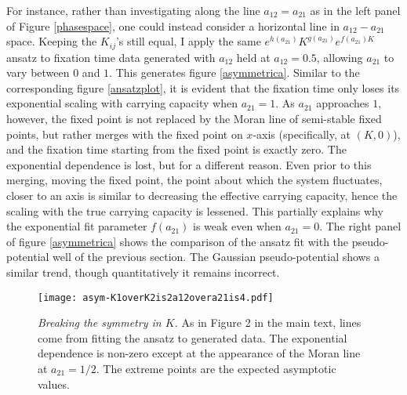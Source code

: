 For instance, rather than investigating along the line $a_{12} = a_{21}$ as in the left panel of Figure \ref{phasespace}, one could instead consider a horizontal line in $a_{12}-a_{21}$ space. 
Keeping the $K_{ij}$'s still equal, I apply the same $e^{h(a_{21})}K^{g(a_{21})}e^{f(a_{21})K}$ ansatz to fixation time data generated with $a_{12}$ held at $a_{12}=0.5$, allowing $a_{21}$ to vary between $0$ and $1$. 
This generates figure \ref{asymmetrica}. %
Similar to the corresponding figure \ref{ansatzplot}, it is evident that the fixation time only loses its exponential scaling with carrying capacity when $a_{21}=1$. 
As $a_{21}$ approaches $1$, however, the fixed point is not replaced by the Moran line of semi-stable fixed points, but rather merges with the fixed point on $x$-axis (specifically, at $(K,0)$), and the fixation time starting from the fixed point is exactly zero. 
The exponential dependence is lost, but for a different reason. 
Even prior to this merging, moving the fixed point, the point about which the system fluctuates, closer to an axis is similar to decreasing the effective carrying capacity, hence the scaling with the true carrying capacity is lessened. 
This partially explains why the exponential fit parameter $f(a_{21})$ is weak even when $a_{21}=0$. 
The right panel of figure \ref{asymmetrica} shows the comparison of the ansatz fit with the pseudo-potential well of the previous section. 
The Gaussian pseudo-potential shows a similar trend, though quantitatively it remains incorrect. 

\begin{figure}[ht]
	\centering
	\texttt{[image: asym-K1overK2is2a12overa21is4.pdf]}
	\caption{\emph{Breaking the symmetry in $K$.} As in Figure 2 in the main text, lines come from fitting the ansatz to generated data. The exponential dependence is non-zero except at the appearance of the Moran line at $a_{21}=1/2$. The extreme points are the expected asymptotic values. }
	\label{asymmetricK}
\end{figure}

